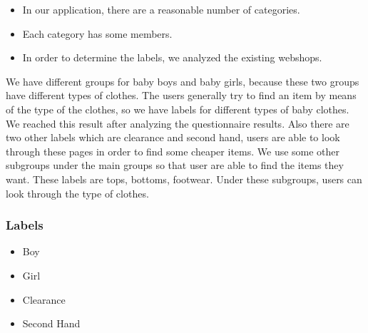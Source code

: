 \begin{itemize}
\item In our application, there are a reasonable number of categories. 
\item Each category has some members. 
\item In order to determine the labels, we analyzed the existing webshops.
\end{itemize}

We have different 
groups 
for baby boys and baby girls, because these two groups have different types of clothes. The users generally try to find an item by means of the type of the clothes, so we have labels for different types of baby clothes. 
We reached this result after analyzing the questionnaire results. Also there are two other labels which are clearance and second hand, users are able to look through these pages in order to find some cheaper items.
We use some other subgroups under the main groups so that user are able to find the items they want. 
These labels are tops, bottoms, footwear. Under these subgroups, users can look through the type of clothes.

\subsubsection{Labels}
\begin{itemize}
\setlength{\itemsep}{-3pt}
\setlength{\parskip}{0pt}
\setlength{\parsep}{0pt}
 \item Boy 
 \item Girl 
 \item Clearance 
 \item Second Hand
\end{itemize}

